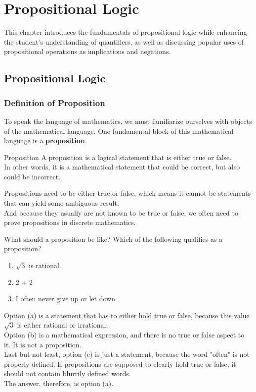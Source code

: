 \chapter{Propositional Logic}
This chapter introduces the fundamentals of propositional logic while enhancing the student's understanding of quantifiers, as well as discussing popular uses of propositional operations as implications and negations.

\section{Propositional Logic}

\subsection{Definition of Proposition}
To speak the language of mathematics, we must familiarize ourselves with objects of the mathematical language. One fundamental block of this mathematical language is a \textbf{proposition}.
\begin{ln-define}{Proposition}{}
    A proposition is a logical statement that is either true or false. \\
    In other words, it is a mathematical statement that could be correct, but also could be incorrect.
\end{ln-define}
Propositions need to be either true or false, which means it cannot be statements that can yield some ambiguous result. \\
And because they usually are not known to be true or false, we often need to prove propositions in discrete mathematics.
\begin{ln-think}{What should a proposition be like?}{}
    Which of the following qualifies as a proposition?
    \begin{enumerate}
        \item[(a)] $\sqrt{3}$ is rational.
        \item[(b)] 2 + 2
        \item[(c)] I often never give up or let down
    \end{enumerate}
    \tcblower
    Option (a) is a statement that has to either hold true or false, because this value $\sqrt{3}$ is either rational or irrational. \\
    Option (b) is a mathematical expression, and there is no true or false aspect to it. It is not a proposition. \\
    Last but not least, option (c) is just a statement, because the word "often" is not properly defined. If propositions are supposed to clearly hold true or false, it should not contain blurrily defined words. \\
    The answer, therefore, is option (a).
\end{ln-think}

